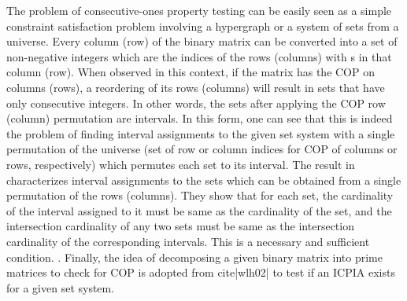 \documentclass[MS]             %
              {iitmdiss_as}    %
\begin{document}
The problem of consecutive-ones property testing can be easily seen as
a simple constraint satisfaction problem involving a hypergraph or a
system of sets from a universe. Every column (row) of the binary
matrix can be converted into a set of non-negative integers which are
the indices of the rows (columns) with {\un}s in that column
(row). When observed in this context, if the matrix has the COP on
columns (rows), a reordering of its rows (columns) will result in sets
that have only consecutive integers. In other words, the sets after
applying the COP row (column) permutation are intervals.  In this
form, one can see that this is indeed the problem of finding interval
assignments to the given set system \cite{nsnrs09} with a single
permutation of the universe (set of row or column indices for COP of
columns or rows, respectively) which permutes each set to its
interval. The result in \cite{nsnrs09} characterizes interval
assignments to the sets which can be obtained from a single
permutation of the rows (columns). They show that for each set, the
cardinality of the interval assigned to it must be same as the
cardinality of the set, and the intersection cardinality of any two
sets must be same as the intersection cardinality of the corresponding
intervals. This is a necessary and sufficient
condition. .  Finally,
the idea of decomposing a given binary matrix into prime matrices to
check for COP is adopted from cite|wlh02| to test if an ICPIA exists
for a given set system.
\end{document}
